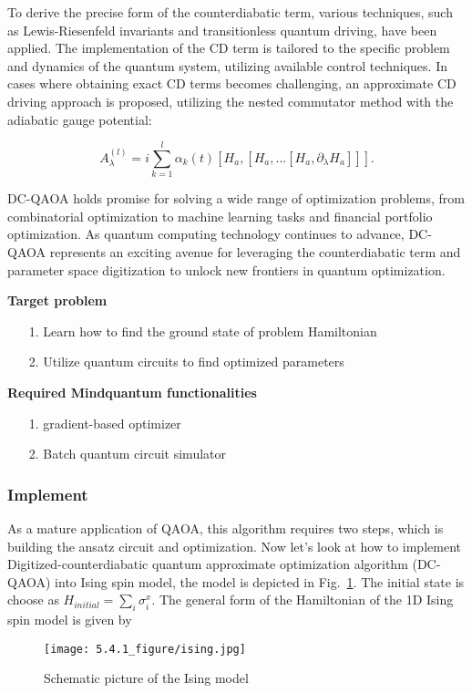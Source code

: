 To derive the precise form of the counterdiabatic term, various techniques, such as Lewis-Riesenfeld invariants and transitionless quantum driving, have been applied. The implementation of the CD term is tailored to the specific problem and dynamics of the quantum system, utilizing available control techniques. In cases where obtaining exact CD terms becomes challenging, an approximate CD driving approach is proposed, utilizing the nested commutator method\cite{Chandarana_2023} with the adiabatic gauge potential:

\begin{equation}
    A_{\lambda}^{(l)} = i\sum_{k=1}^{l}\alpha_{k}(t)[H_{a},[H_{a},...[H_{a}, \partial_{\lambda}H_{a}]]].
\end{equation}

DC-QAOA holds promise for solving a wide range of optimization problems, from combinatorial optimization to machine learning tasks and financial portfolio optimization. As quantum computing technology continues to advance, DC-QAOA represents an exciting avenue for leveraging the counterdiabatic term and parameter space digitization to unlock new frontiers in quantum optimization.

\textbf{Target problem}
\begin{itemize}
    \item[1.] Learn how to find the ground state of problem Hamiltonian
    \item[2.] Utilize quantum circuits to find optimized parameters
\end{itemize}
\textbf{Required Mindquantum functionalities}
\begin{itemize}
    \item[1.] gradient-based optimizer
    \item[2.] Batch quantum circuit simulator

\end{itemize}

\subsubsection{Implement}
As a mature application of QAOA, this algorithm requires two steps, which is building the ansatz circuit and optimization. Now let's look at how to implement Digitized-counterdiabatic quantum approximate optimization algorithm (DC-QAOA) into Ising spin model, the model is depicted in Fig.~\ref{fig:ising}. The initial state is choose as $H_{initial} = \sum_{i}\sigma_{i}^{x}$. The general form of the Hamiltonian of the 1D Ising spin model is given by
\begin{figure}
    \centering
    \texttt{[image: 5.4.1\_figure/ising.jpg]}
    \caption{Schematic picture of the Ising model}
    \label{fig:ising}
\end{figure}

